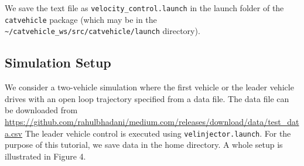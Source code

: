 \documentclass[
]{article}
\newenvironment{Shaded}{\begin{snugshade}}{\end{snugshade}}
\newcommand{\ExtensionTok}[1]{#1}
\newcommand{\NormalTok}[1]{#1}
\newcommand{\OperatorTok}[1]{\textcolor[rgb]{0.81,0.36,0.00}{\textbf{#1}}}
\newcommand{\PreprocessorTok}[1]{\textcolor[rgb]{0.56,0.35,0.01}{\textit{#1}}}
\newcommand{\StringTok}[1]{\textcolor[rgb]{0.31,0.60,0.02}{#1}}
\newcommand{\VariableTok}[1]{\textcolor[rgb]{0.00,0.00,0.00}{#1}}
\begin{document}
\begin{Shaded}
\end{Shaded}

We save the text file as \texttt{velocity\_control.launch} in the launch
folder of the \texttt{catvehicle} package (which may be in the
\texttt{\textasciitilde{}/catvehicle\_ws/src/catvehicle/launch}
directory).

\hypertarget{simulation-setup}{%
\subsection{Simulation Setup}\label{simulation-setup}}

We consider a two-vehicle simulation where the first vehicle or the
leader vehicle drives with an open loop trajectory specified from a data
file. The data file can be downloaded from
\url{https://github.com/rahulbhadani/medium.com/releases/download/data/test_data.csv}
The leader vehicle control is executed using
\texttt{velinjector.launch}. For the purpose of this tutorial, we save
data in the home directory. A whole setup is illustrated in Figure 4.
\end{document}
